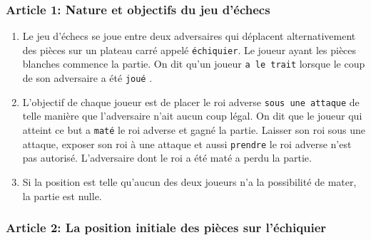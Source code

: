 \subsubsection{Article 1: Nature et objectifs du jeu d’échecs}

\begin{enumerate}


\item Le jeu d’échecs se joue entre deux adversaires  qui  déplacent  alternativement  des  pièces  sur  un  plateau carré appelé \texttt{échiquier}. Le joueur ayant les pièces blanches commence la partie. On dit qu’un joueur \texttt{a le trait} lorsque le coup de son adversaire a été \texttt{joué} .

\item L’objectif  de chaque  joueur  est  de  placer  le  roi  adverse \texttt{sous  une  attaque} de  telle  manière  que l’adversaire n’ait aucun coup légal. On dit que le joueur qui atteint ce but a \texttt{maté} le roi adverse et gagné la partie. Laisser son roi sous une attaque, exposer son roi à une attaque et aussi \texttt{prendre} le roi adverse n'est pas autorisé. L’adversaire dont le roi a été maté a perdu la partie.

\item Si la position est telle qu’aucun des deux joueurs n’a la possibilité de mater, la partie est nulle. \\

\end{enumerate}

\subsubsection{Article 2: La position initiale des pièces sur l’échiquier}

